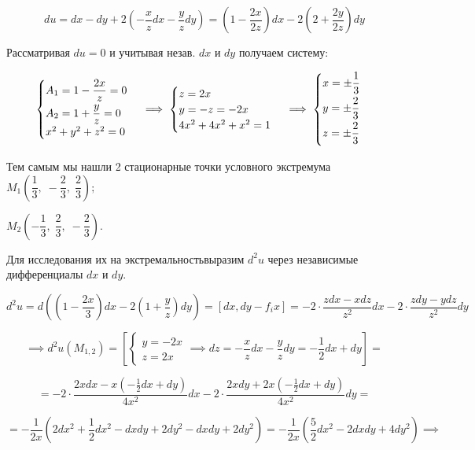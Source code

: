 \documentclass[../../main.tex]{subfiles}
\begin{document}
	
	\[du = dx - dy + 2\left(-\dfrac{x}{z} dx - \dfrac{y}{z}dy\right) = 
	\left(1 - \dfrac{2x}{2z}\right)dx - 2\left(2 + \dfrac{2y}{2z}\right)dy\]
	
	Рассматривая $du = 0$ и учитывая незав. $dx$ и $dy$ получаем систему:
	
	\[\begin{cases}
	\smallskip
	A_1 = 1 - \dfrac{2x}{z} = 0\\
	A_2 = 1 + \dfrac{y}{z} = 0\\
	x^2 + y^2 + z^2 = 0
	\end{cases} \implies \begin{cases}
	z = 2x\\
	y = -z = -2x\\
	4x^2 + 4x^2 + x^2 = 1
	\end{cases} \implies \begin{cases}
	\smallskip
	x = \pm \dfrac{1}{3}\\
	\smallskip
	y = \pm \dfrac{2}{3}\\
	\smallskip
	z = \pm \dfrac{2}{3}\\
	\end{cases}\]
	
	Тем самым мы нашли 2 стационарные точки условного экстремума 
	$M_1\left(\dfrac{1}{3},\; -\dfrac{2}{3},\; \dfrac{2}{3}\right);$
	
	$ M_2\left(-\dfrac{1}{3},\; \dfrac{2}{3}, \; -\dfrac{2}{3}\right)$.
	
	Для исследования их на экстремальностьвыразим $d^2u$ 
	через независимые дифференциалы $dx$ и $dy$.
	
	\[d^2u = d\left( \left(1 - \dfrac{2x}{3}\right)dx - 
	2\left(1 + \dfrac{y}{z}\right)dy\right) = 
	\left[dx, dy - f_ix\right] = -2 \cdot 
	\dfrac{zdx - xdz}{z^2}dx - 2 \cdot \dfrac{zdy - ydz}{z^2}dy\]
	
	\[\implies d^2u\left(M_{1, 2}\right) = \left[
	\begin{cases}
	y = -2x\\
	z = 2x 
	\end{cases} \implies dz = -\dfrac{x}{z}dx - \dfrac{y}{z}dy = 
	-\dfrac{1}{2}dx + dy 
	\right] =\]
	
	\[ = -2 \cdot \frac{2xdx - x\left(-\frac{1}{2}dx + dy\right)}{4x^2}dx - 
	2 \cdot \frac{2xdy + 2x \left(-\frac{1}{2}dx + dy\right)}{4x^2}dy = \]
	
	\[= -\dfrac{1}{2x}\left(2dx^2 + \dfrac{1}{2}dx^2 - dxdy + 2dy^2 - 
	dxdy + 2dy^2 \right) = -\dfrac{1}{2x} \left( \dfrac{5}{2} dx^2 - 2dxdy + 4dy^2 \right) \implies \]
	
\end{document}
